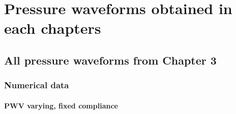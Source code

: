 
\chapter{Pressure waveforms obtained in each chapters}

\ifpdf
    \graphicspath{{appendix1/Figs/Raster/}{appendix1/Figs/PDF/}{appendix1/Figs/}}
\else
    \graphicspath{{appendix1/Figs/Vector/}{appendix1/Figs/}}
\fi


\section{All pressure waveforms from Chapter 3}

\clearpage

\newpage\null\thispagestyle{empty}\newpage

\subsection{Numerical data}
\subsubsection{PWV varying, fixed compliance}


